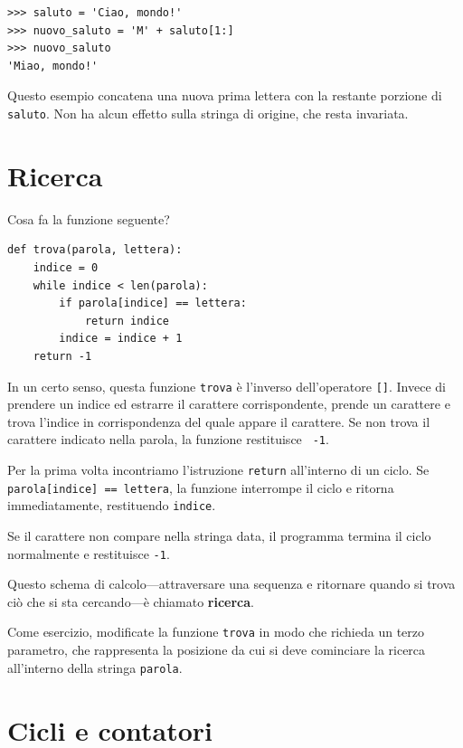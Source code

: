 \documentclass[10pt]{book}
\begin{document}
\begin{verbatim}
>>> saluto = 'Ciao, mondo!'
>>> nuovo_saluto = 'M' + saluto[1:]
>>> nuovo_saluto
'Miao, mondo!'
\end{verbatim}
%
Questo esempio concatena una nuova prima lettera con la restante porzione di {\tt saluto}. Non ha alcun effetto sulla stringa di origine, che resta invariata.


\section{Ricerca}
\label{find}

Cosa fa la funzione seguente?

\begin{verbatim}
def trova(parola, lettera):
    indice = 0
    while indice < len(parola):
        if parola[indice] == lettera:
            return indice
        indice = indice + 1
    return -1
\end{verbatim}
%
In un certo senso, questa funzione {\tt trova} è l'inverso dell'operatore {\tt []}.
Invece di prendere un indice ed estrarre il carattere corrispondente, prende un carattere e trova l'indice in corrispondenza del quale appare il carattere. Se non trova il carattere indicato nella parola, la funzione restituisce {\tt
-1}.

Per la prima volta incontriamo l'istruzione {\tt return} all'interno di un ciclo. Se {\tt parola[indice] == lettera}, la funzione interrompe il ciclo e ritorna immediatamente, restituendo {\tt indice}. 

Se il carattere non compare nella stringa data, il programma termina il ciclo  normalmente e restituisce {\tt -1}.

Questo schema di calcolo---attraversare una sequenza e ritornare quando si trova ciò che si sta cercando---è chiamato {\bf ricerca}.

Come esercizio, modificate la funzione {\tt trova} in modo che richieda un terzo parametro, che rappresenta la posizione da cui si deve cominciare la ricerca all'interno della stringa {\tt parola}.


\section{Cicli e contatori}
\label{counter}
\end{document}
